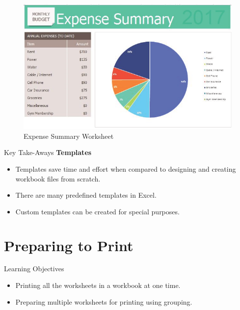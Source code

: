 \begin{figure}[H]
	\centering
	\includegraphics[width=\maxwidth{.95\linewidth}]{gfx/ch06_fig14}
	\caption{Expense Summary Worksheet}
	\label{06:fig14}
\end{figure}

\begin{center}
	\begin{tkwbox}{Key Take-Aways}
		\textbf{Templates}
		\\
		\begin{itemize}
			\setlength{\itemsep}{0pt}
			\setlength{\parskip}{0pt}
			\setlength{\parsep}{0pt}
			
			\item Templates save time and effort when compared to designing and creating workbook files from scratch.
			\item There are many predefined templates in Excel.
			\item Custom templates can be created for special purposes.
			
		\end{itemize}
	\end{tkwbox}
\end{center}

\section{Preparing to Print}

\begin{center}
	\begin{objbox}{Learning Objectives}
		\begin{itemize}
			\setlength{\itemsep}{0pt}
			\setlength{\parskip}{0pt}
			\setlength{\parsep}{0pt}
			
			\item Printing all the worksheets in a workbook at one time.
			\item Preparing multiple worksheets for printing using grouping.
			
		\end{itemize}
	\end{objbox}
\end{center}

